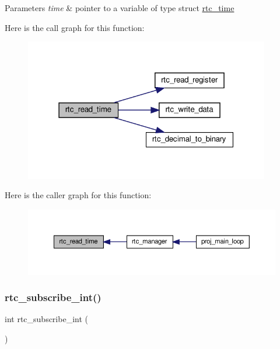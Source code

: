 \begin{DoxyParams}{Parameters}
{\em time} & pointer to a variable of type struct \hyperlink{structrtc__time}{rtc\+\_\+time} \\
\hline
\end{DoxyParams}
Here is the call graph for this function\+:
\nopagebreak
\begin{figure}[H]
\begin{center}
\leavevmode
\includegraphics[width=304pt]{group__rtc_ga94747f0e2c4ea5ae327017d78a25de30_cgraph}
\end{center}
\end{figure}
Here is the caller graph for this function\+:
\nopagebreak
\begin{figure}[H]
\begin{center}
\leavevmode
\includegraphics[width=350pt]{group__rtc_ga94747f0e2c4ea5ae327017d78a25de30_icgraph}
\end{center}
\end{figure}
\mbox{\label{group__rtc_gabd8de825e876e8ef94c64ac616f68a11}} 
\subsubsection{\texorpdfstring{rtc\+\_\+subscribe\+\_\+int()}{rtc\_subscribe\_int()}}
{\footnotesize\ttfamily int rtc\+\_\+subscribe\+\_\+int (\begin{DoxyParamCaption}{ }\end{DoxyParamCaption})}



